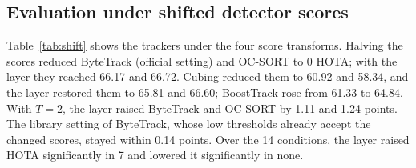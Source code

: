 \documentclass[pdflatex,sn-mathphys-num,iicol]{sn-jnl}
\begin{document}
\subsection{Evaluation under shifted detector scores}\label{sec:shift}
Table~\ref{tab:shift} shows the trackers under the four score transforms. Halving the scores
reduced ByteTrack (official setting) and OC-SORT to 0 HOTA; with the layer they reached 66.17 and
66.72. Cubing reduced them to 60.92 and 58.34, and the layer restored them to 65.81 and 66.60;
BoostTrack rose from 61.33 to 64.84. With $T=2$, the layer raised ByteTrack and OC-SORT by 1.11 and
1.24 points. The library setting of ByteTrack, whose low thresholds already accept the changed
scores, stayed within 0.14 points. Over the 14 conditions, the layer raised HOTA significantly in 7
and lowered it significantly in none.
\end{document}

